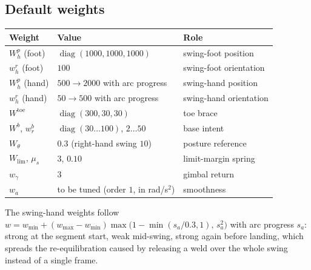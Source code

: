 \documentclass[11pt]{article}
\DeclareMathOperator{\diag}{diag}
\begin{document}
\subsection*{Default weights}
\begin{center}
\begin{tabular}{@{}lll@{}}
\toprule
Weight & Value & Role \\
\midrule
$W^p_h$ (foot) & $\diag(1000,1000,1000)$ & swing-foot position \\
$w^r_h$ (foot) & $100$ & swing-foot orientation \\
$W^p_h$ (hand) & $500\to2000$ with arc progress & swing-hand position \\
$w^r_h$ (hand) & $50\to500$ with arc progress & swing-hand orientation \\
$W^{\mathrm{toe}}$ & $\diag(300,30,30)$ & toe brace \\
$W^b$, $w^b_r$ & $\diag(30\ldots100)$, $2\ldots50$ & base intent \\
$W_\theta$ & $0.3$ (right-hand swing $10$) & posture reference \\
$W_{\mathrm{lim}}$, $\mu_s$ & $3$, $0.10$ & limit-margin spring \\
$w_\gamma$ & $3$ & gimbal return \\
$w_a$ & to be tuned (order $1$, in rad/s$^2$) & smoothness \\
\bottomrule
\end{tabular}
\end{center}
The swing-hand weights follow
$w=w_{\min}+(w_{\max}-w_{\min})\max\bigl(1-\min(s_a/0.3,1),\,s_a^2\bigr)$
with arc progress $s_a$: strong at the segment start, weak mid-swing, strong
again before landing, which spreads the re-equilibration caused by releasing a
weld over the whole swing instead of a single frame.
\end{document}
